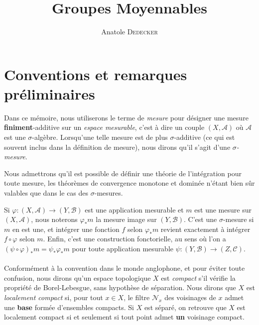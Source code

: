 \documentclass[a4paper,12pt]{article}
\newcommand{\ssi}{si et seulement si }
\newcommand{\comp}{\circ}
\newcommand{\nhds}{\mathcal{N}}
\begin{document}
\begin{titlepage}
\title{Groupes Moyennables}
\author{Anatole \textsc{Dedecker}}
\maketitle
\thispagestyle{empty}
\end{titlepage}

\tableofcontents
\thispagestyle{empty}

\clearpage


\section*{Conventions et remarques préliminaires}

Dans ce mémoire, nous utiliserons le terme de \textit{mesure} pour désigner une mesure \textbf{finiment}-additive sur un 
\textit{espace mesurable}, c'est à dire un couple $(X, \mathcal{A})$ où $\mathcal{A}$ est une $\sigma$-algèbre. 
Lorsqu'une telle mesure est de plus $\sigma$-additive (ce qui est souvent inclus dans la définition de \og{}mesure\fg{}),
nous dirons qu'il s'agit d'une \textit{$\sigma$-mesure}. 

Nous admettrons qu'il est possible de définir une théorie de l'intégration pour toute mesure, les théorèmes de convergence
monotone et dominée n'étant bien sûr valables que dans le cas des $\sigma$-mesures. 

Si $\varphi:(X,\mathcal{A})\to(Y,\mathcal{B})$ est une application mesurable et $m$ est une mesure sur $(X, \mathcal{A})$, 
nous noterons $\varphi_*m$ la mesure image sur $(Y, \mathcal{B})$. C'est une $\sigma$-mesure si $m$ en est une, et intégrer 
une fonction $f$ selon $\varphi_*m$ revient exactement à intégrer $f\comp\varphi$ selon $m$. Enfin, c'est une construction
fonctorielle, au sens où l'on a $(\psi\comp\varphi)_*m = \psi_*\varphi_*m$ pour toute application mesurable 
$\psi : (Y, \mathcal{B})\to(Z, \mathcal{C})$. 

\paragraph{}

Conformément à la convention dans le monde anglophone, et pour éviter toute confusion, nous dirons qu'un espace topologique
$X$ est \emph{compact} s'il vérifie la propriété de Borel-Lebesgue, sans hypothèse de séparation. 
Nous dirons que $X$ est \emph{localement compact} si, pour tout $x\in X$, le filtre $\nhds_x$ des voisinages de $x$ admet
une \textbf{base} formée d'ensembles compacts. Si $X$ est séparé, on retrouve que $X$ est localement compact 
\ssi tout point admet \textbf{un} voisinage compact.
\end{document}
